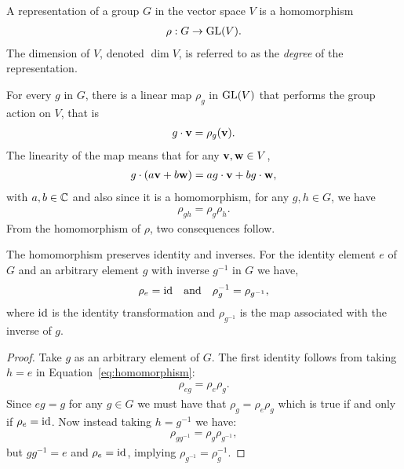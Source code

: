 \begin{definition}[Representation]\cite{Serre}
	A representation of a group $G$ in the vector space $V$ is a homomorphism
	\begin{align}\label{eq:DefRepr}
		\rho: G \rightarrow \text{GL}(V).
	\end{align}
	The dimension of $V$, denoted $\dim V$, is referred to as the \textit{degree} of the representation.
\end{definition}
For every $g$ in $G$, there is a linear map $\rho_g$ in $\text{GL}(V)$ that performs the group action on $V$, that is 
\begin{align*}
	g \cdot \mathbf{v} = \rho_g (\mathbf{v}).
\end{align*}
The linearity of the map means that for any $\mathbf{v}, \mathbf{w} \in V$,
\begin{align*}%
	g \cdot (a\vvec + b\wvec) = ag\cdot\vvec + bg\cdot\wvec,
\end{align*} 
with $a,b \in \mathbb{C}$ and also since it is a homomorphism, for any $g,h \in G$, we have
\begin{align}\label{eq:homomorphism}
	\rho_{gh} = \rho_g \rho_h.
\end{align}
From the homomorphism of $\rho$, two consequences follow.
\begin{proposition}\label{prop:homoidinv}
	The homomorphism preserves identity and inverses. For the identity element $e$ of $G$ and an arbitrary element $g$ with inverse $g^{-1}$ in $G$ we have,
	\begin{align}\label{eq:rhoIdAndInv}
		\rho_e = \text{id} \quad \text{and} \quad \rho_g^{-1} = \rho_{g^{-1}},
	\end{align}
	where $\text{id}$ is the identity transformation and $\rho_{g^{-1}}$ is the map associated with the inverse of $g$.
\end{proposition}
\begin{proof}
	Take $g$ as an arbitrary element of $G$. The first identity follows from taking $h=e$ in Equation~\ref{eq:homomorphism}:
	\begin{align*}
		\rho_{eg} = \rho_e \rho_g.
	\end{align*}
	Since $eg=g$ for any $g\in G$ we must have that $\rho_g = \rho_e\rho_g$ which is true if and only if $\rho_e = \text{id}$. Now instead taking $h=g^{-1}$ we have:
	\begin{align*}
		\rho_{gg^{-1}} = \rho_g \rho_{g^{-1}},
	\end{align*}
	but $gg^{-1} = e$ and $\rho_e = \text{id}$, implying $\rho_{g^{-1}} = \rho_g^{-1}$.
\end{proof}

